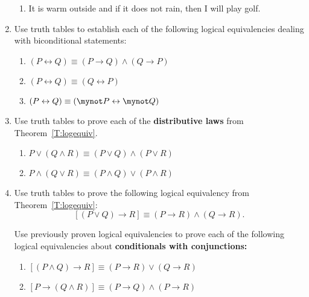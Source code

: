 \begin{enumerate}
\begin{enumerate}
\item It is warm outside and if it does not rain, then I will play golf.
\end{enumerate}

\item Use truth tables to establish each of the following logical equivalencies dealing with biconditional statements: \label{exer:sec23-bicond}
  \begin{enumerate}
    \item $\left( {P \leftrightarrow Q} \right) \equiv \left( {P \to Q} \right) \wedge \left( {Q \to P} \right)$ \label{exer:bicond} \label{exer:sec23-biconda}
    \item $\left( {P \leftrightarrow Q} \right) \equiv \left( {Q \leftrightarrow P} \right)$
    \item $\left( {P \leftrightarrow Q} \right) \equiv \left( {\mynot  P \leftrightarrow \mynot  Q} \right)$
  \end{enumerate}
%
\item Use truth tables to prove each of the \textbf{distributive laws} from Theorem~\ref{T:logequiv}. \label{exer:sec22-distrib}
%
  \begin{enumerate}
    \item $P \vee \left( {Q \wedge R} \right) \equiv \left( {P \vee Q} \right) \wedge \left( {P \vee R} \right)$
    \item $P \wedge \left( {Q \vee R} \right) \equiv \left( {P \wedge Q} \right) \vee \left( {P \wedge R} \right)$
  \end{enumerate}



\item Use truth tables to prove the following logical equivalency from Theorem~\ref{T:logequiv}:
\[
\left[ {\left( {P \vee Q} \right) \to R} \right] \equiv \left( {P \to R} \right) \wedge \left( {Q \to R} \right). \label{exer:sec23-6}
\]



\xitem Use previously proven logical equivalencies to prove each of the following logical equivalencies about \textbf{conditionals with conjunctions:} \label{exer:sec23-7}
  \begin{enumerate}
    \item $\left[ {\left( {P \wedge Q} \right) \to R} \right] \equiv \left( {P \to R} \right) \vee \left( {Q \to R} \right)$
    \item $\left[ {P \to \left( {Q \wedge R} \right)} \right] \equiv \left( {P \to Q} \right) \wedge \left( {P \to R} \right)$
  \end{enumerate}




\end{enumerate}
